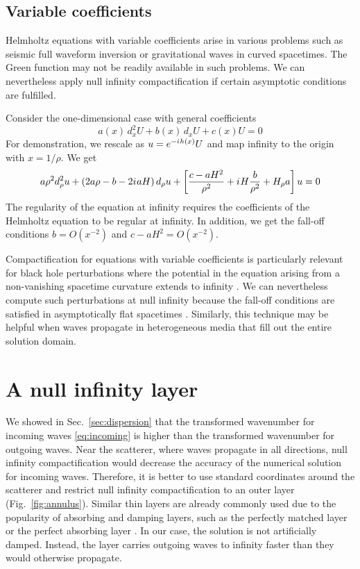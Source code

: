 \documentclass[final,onefignum,onetabnum]{siamart190516}
\newcommand{\iu}{{i\mkern1mu}}
\begin{document}
\subsection{Variable coefficients}

Helmholtz equations with variable coefficients arise in various problems such as seismic full waveform inversion or gravitational waves in curved spacetimes. The Green function may not be readily available in such problems. We can nevertheless apply null infinity compactification if certain asymptotic conditions are fulfilled.  

Consider the one-dimensional case with general coefficients
\[ a(x) \, d_x^2 U + b(x) \, d_x U + c(x) U = 0 \]
For demonstration, we rescale as $u=e^{-\iu h(x)} U$ and map infinity to the origin with $x=1/\rho$. We get 
\[ a \rho^2 d_\rho^2 u + \left( 2 a \rho - b - 2 \iu a H \right) d_\rho u + \left[ \frac{c-a H^2}{\rho^2} + \iu H \frac{b}{\rho^2} + H_\rho a \right] u = 0 \]
The regularity of the equation at infinity requires the coefficients of the Helmholtz equation to be regular at infinity. In addition, we get the fall-off conditions $b=O(x^{-2})$ and $c-a H^2=O(x^{-2})$.

Compactification for equations with variable coefficients is particularly relevant for black hole perturbations where the potential in the equation arising from a non-vanishing spacetime curvature extends to infinity \cite{regge1957stability}. We can nevertheless compute such perturbations at null infinity because the fall-off conditions are satisfied in asymptotically flat spacetimes \cite{ZengFramework, jaramillo2021pseudospectrum}. Similarly, this technique may be helpful when waves propagate in heterogeneous media that fill out the entire solution domain.

\section{A null infinity layer}\label{sec:nil}
We showed in Sec.~\ref{sec:dispersion} that the transformed wavenumber for incoming waves \eqref{eq:incoming} is higher than the transformed wavenumber for outgoing waves. Near the scatterer, where waves propagate in all directions, null infinity compactification would decrease the accuracy of the numerical solution for incoming waves. Therefore, it is better to use standard coordinates around the scatterer and restrict null infinity compactification to an outer layer (Fig.~\ref{fig:annulus}). Similar thin layers are already commonly used due to the popularity of absorbing and damping layers, such as the perfectly matched layer \cite{BERENGER1994185} or the perfect absorbing layer \cite{wang2017perfect, yang2021truly}. In our case, the solution is not artificially damped. Instead, the layer carries outgoing waves to infinity faster than they would otherwise propagate. 
\end{document}
